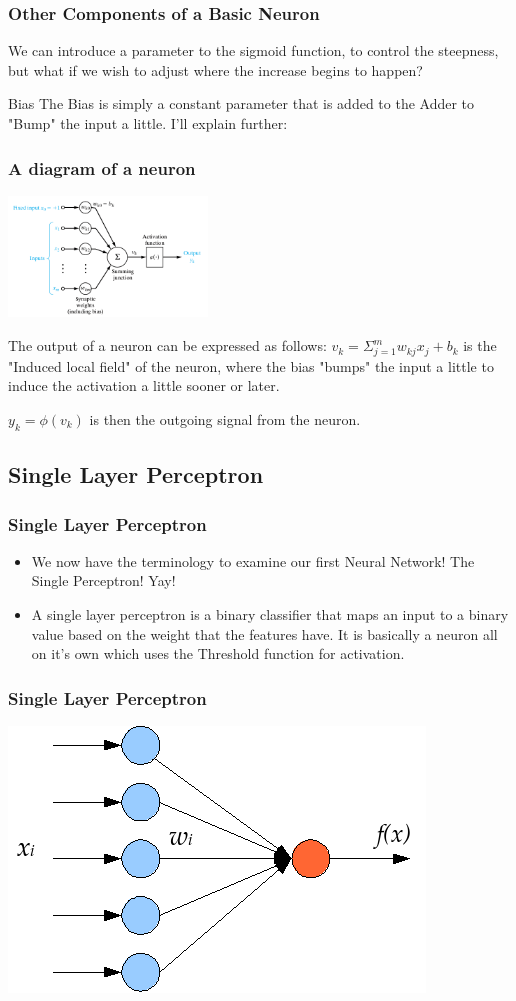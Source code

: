 \documentclass{beamer}
\begin{document}
\begin{frame}
\frametitle{Other Components of a Basic Neuron}
We can introduce a parameter to the sigmoid function, to control the steepness, but what if we wish to adjust where the increase begins to happen? 
\begin{block}{Bias}
The Bias is simply a constant parameter that is added to the Adder to "Bump" the input a little. I'll explain further:
\end{block}

\end{frame}

\begin{frame}
\frametitle{A diagram of a neuron}
\includegraphics[width=200px]{neurond.png}


The output of a neuron can be expressed as follows:
$v_k=\Sigma_{j=1}^{m}w_{kj}x_j+b_k$ is the "Induced local field" of the neuron, where the bias "bumps" the input a little to induce the activation a little sooner or later.

$y_k = \phi(v_k)$ is then the outgoing signal from the neuron.
\end{frame}

\subsection{Single Layer Perceptron}
\begin{frame}
\frametitle{Single Layer Perceptron}
\begin{itemize}
\item We now have the terminology to examine our first Neural Network! The Single Perceptron! Yay!

\item A single layer perceptron is a binary classifier that maps an input to a binary value based on the weight that the features have. It is basically a neuron all on it's own which uses the Threshold function for activation.
\end{itemize}
\end{frame}

\begin{frame}
\frametitle{Single Layer Perceptron}
\includegraphics{slp.png}
\end{frame}
\end{document}
